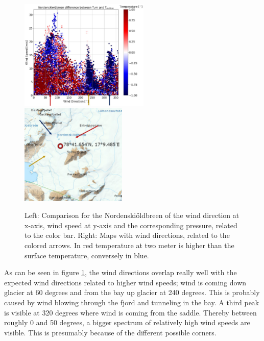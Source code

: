 \documentclass[11pt]{report}
\begin{document}
\begin{figure}[h]
\includegraphics[scale=1, width=0.55\textwidth]{ulve-WS-WD.jpg}
\includegraphics[scale=1, width=0.45\textwidth]{norde-WS-WD-rose-2.jpg}
\caption{Left: Comparison for the Nordenski\H{o}ldbreen of the wind direction at x-axis, wind speed at y-axis and the corresponding pressure, related to the color bar. Right: Maps with wind directions, related to the colored arrows. In red temperature at two meter is higher than the surface temperature, conversely in blue.}
\label{fig:PRnorde}
\end{figure}

As can be seen in figure \ref{fig:PRnorde}, the wind directions overlap really well with the expected wind directions related to higher wind speeds; wind is coming down glacier at 60 degrees and from the bay up glacier at 240 degrees. This is probably caused by wind blowing through the fjord and tunneling in the bay. A third peak is visible at 320 degrees where wind is coming from the saddle. Thereby between roughly 0 and 50 degrees, a bigger spectrum of relatively high wind speeds are visible. This is presumably because of the different possible corners.
\end{document}
